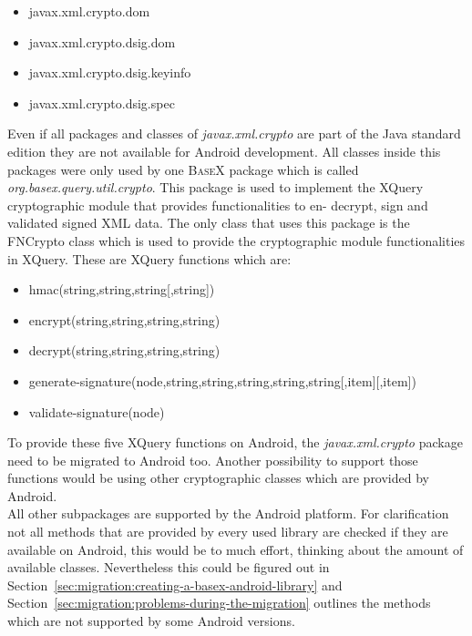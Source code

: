 \begin{itemize}
  \item javax.xml.crypto.dom
  \item javax.xml.crypto.dsig.dom
  \item javax.xml.crypto.dsig.keyinfo
  \item javax.xml.crypto.dsig.spec
\end{itemize}
Even if all packages and classes of \textit{javax.xml.crypto} are part of the Java standard edition they are not available for Android development.
All classes inside this packages were only used by one \textsc{BaseX} package which is called \textit{org.basex.query.\-util.crypto}.
This package is used to implement the XQuery cryptographic module that provides functionalities to en- decrypt, sign and validated signed XML data.
The only class that uses this package is the FNCrypto class which is used to provide the cryptographic module functionalities in XQuery.
These are XQuery functions which are:
\begin{itemize}
  \item hmac(string,string,string[,string])
  \item encrypt(string,string,string,string)
  \item decrypt(string,string,string,string)
  \item generate-signature(node,string,string,string,string,string[,item][,item])
  \item validate-signature(node)
\end{itemize}
To provide these five XQuery functions on Android, the \textit{javax.xml.crypto} package need to be migrated to Android too.
Another possibility to support those functions would be using other cryptographic classes which are provided by Android.\\
All other subpackages are supported by the Android platform.
For clarification not all methods that are provided by every used library are checked if they are available on Android, this would be to much effort, thinking about the amount of available classes.
Nevertheless this could be figured out in Section~\ref{sec:migration:creating-a-basex-android-library} and Section~\ref{sec:migration:problems-during-the-migration} outlines the methods which are not supported by some Android versions.

